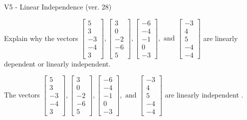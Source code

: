 \begin{exercise}
  \begin{exerciseTitle}V5 - Linear Independence (ver. 28)\end{exerciseTitle}
  \begin{exerciseStatement}
    Explain why the vectors \(\left[\begin{array}{r}
5 \\
3 \\
-3 \\
-4 \\
3
\end{array}\right] , \left[\begin{array}{r}
3 \\
0 \\
-2 \\
-6 \\
5
\end{array}\right] , \left[\begin{array}{r}
-6 \\
-4 \\
-1 \\
0 \\
-3
\end{array}\right] , \text{ and } \left[\begin{array}{r}
-3 \\
4 \\
5 \\
-4 \\
-4
\end{array}\right]\) are linearly dependent or linearly independent.	


  \end{exerciseStatement}
  \begin{exerciseAnswer}
   The vectors \(\left[\begin{array}{r}
5 \\
3 \\
-3 \\
-4 \\
3
\end{array}\right] , \left[\begin{array}{r}
3 \\
0 \\
-2 \\
-6 \\
5
\end{array}\right] , \left[\begin{array}{r}
-6 \\
-4 \\
-1 \\
0 \\
-3
\end{array}\right] , \text{ and } \left[\begin{array}{r}
-3 \\
4 \\
5 \\
-4 \\
-4
\end{array}\right]\) are 
  	 linearly independent  .
  


  \end{exerciseAnswer}
\end{exercise}